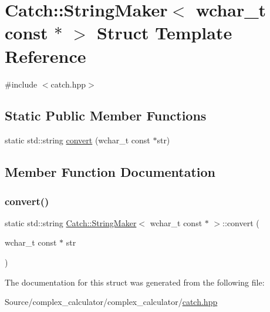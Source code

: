 \hypertarget{struct_catch_1_1_string_maker_3_01wchar__t_01const_01_5_01_4}{}\section{Catch\+:\+:String\+Maker$<$ wchar\+\_\+t const $\ast$ $>$ Struct Template Reference}
\label{struct_catch_1_1_string_maker_3_01wchar__t_01const_01_5_01_4}


{\ttfamily \#include $<$catch.\+hpp$>$}

\subsection*{Static Public Member Functions}
\begin{DoxyCompactItemize}
\item 
static std\+::string \mbox{\hyperlink{struct_catch_1_1_string_maker_3_01wchar__t_01const_01_5_01_4_ae7535a1f417ace45ca05e4389334ffeb}{convert}} (wchar\+\_\+t const $\ast$str)
\end{DoxyCompactItemize}


\subsection{Member Function Documentation}
\mbox{\label{struct_catch_1_1_string_maker_3_01wchar__t_01const_01_5_01_4_ae7535a1f417ace45ca05e4389334ffeb}} 
\subsubsection{\texorpdfstring{convert()}{convert()}}
{\footnotesize\ttfamily static std\+::string \mbox{\hyperlink{struct_catch_1_1_string_maker}{Catch\+::\+String\+Maker}}$<$ wchar\+\_\+t const $\ast$ $>$\+::convert (\begin{DoxyParamCaption}\item[{wchar\+\_\+t const $\ast$}]{str }\end{DoxyParamCaption})\hspace{0.3cm}{\ttfamily [static]}}



The documentation for this struct was generated from the following file\+:\begin{DoxyCompactItemize}
\item 
Source/complex\+\_\+calculator/complex\+\_\+calculator/\mbox{\hyperlink{catch_8hpp}{catch.\+hpp}}\end{DoxyCompactItemize}
